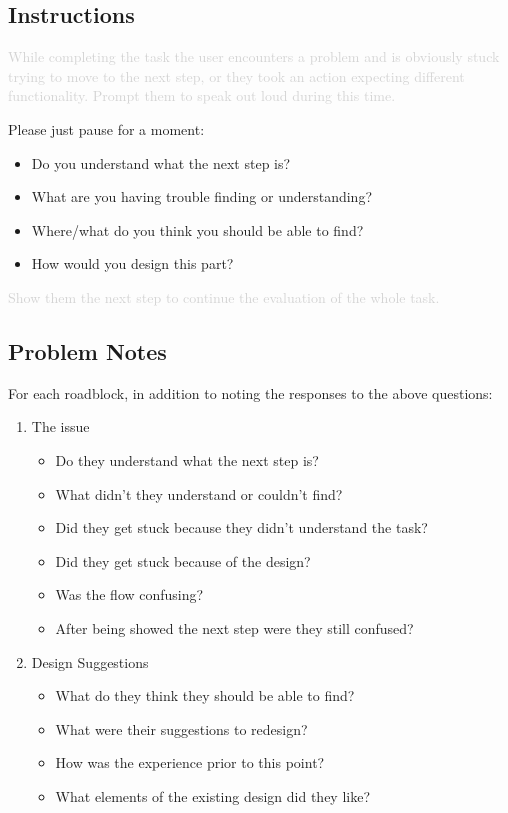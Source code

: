 \documentclass[a4 paper, 10pt]{article}
\begin{document}
    \subsection*{Instructions}
        \textcolor{lightgray}{While completing the task the user encounters a problem and is obviously stuck trying to move to the next step, or they took an action expecting different functionality. Prompt them to speak out loud during this time.}

        \begin{itshape}
        Please just pause for a moment:
            \begin{itemize}
                \item Do you understand what the next step is?
                \item What are you having trouble finding or understanding?
                \item Where/what do you think you should be able to find?
                \item How would you design this part?
            \end{itemize}
        \end{itshape}

        \textcolor{lightgray}{Show them the next step to continue the evaluation of the whole task.}

    \subsection*{Problem Notes}
    For each roadblock, in addition to noting the responses to the above questions:
    \begin{enumerate}
        \item The issue
            \begin{itemize}
                \item Do they understand what the next step is?
                \item What didn't they understand or couldn't find?        
                \item Did they get stuck because they didn’t understand the task?
                \item Did they get stuck because of the design?
                \item Was the flow confusing?
                \item After being showed the next step were they still confused?    
            \end{itemize}   
        \item Design Suggestions
            \begin{itemize}
                \item What do they think they should be able to find? 
                \item What were their suggestions to redesign?
                \item How was the experience prior to this point?
                \item What elements of the existing design did they like?
            \end{itemize}
    \end{enumerate}
\end{document}
